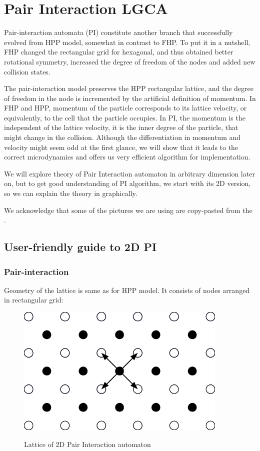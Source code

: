 \chapter{Pair Interaction LGCA}
Pair-interaction automata (PI) constitute another branch that successfully evolved from HPP model, somewhat in contrast to FHP.
To put it in a nutshell, FHP changed the rectangular grid for hexagonal, and thus obtained better rotational symmetry, increased the degree of freedom of the nodes and added new collision states. 

The pair-interaction model preserves the HPP rectangular lattice, and the degree of freedom in the node is incremented by the artificial definition of momentum.
In FHP and HPP, momentum of the particle corresponds to its lattice velocity, or equivalently, to the cell that the particle occupies.
In PI, the momentum is the independent of the lattice velocity, it is the inner degree of the particle, that might change in the collision. 
Although the differentiation in momentum and velocity might seem odd at the first glance, we will show that it leads to the correct microdynamics and offers us very efficient algorithm for implementation.

\bigskip
We will explore theory of Pair Interaction automaton in arbitrary dimension later on, but to get good understanding of PI algorithm, we start with its $2$D version, so we can explain the theory in graphically.

We acknowledge that some of the pictures we are using are copy-pasted from the \cite{wolf}.

\section{User-friendly guide to 2D PI}

\subsection{Pair-interaction}

Geometry of the lattice is same as for HPP model. It consists of nodes arranged in rectangular grid:

\begin{figure}[htbp]
 \centering 
 \includegraphics[width=0.9\textwidth]{./img/pi_grid}
 \label{2dgrid}
 \caption{Lattice of 2D Pair Interaction automaton}
\end{figure}

